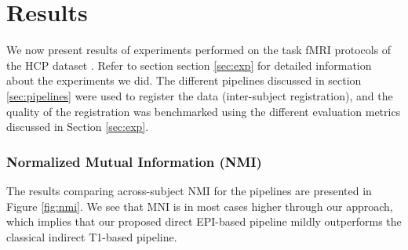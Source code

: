 \section{Results}
\label{sec:results}
We now present results of experiments performed on the task fMRI
protocols of the HCP dataset \citep{VanEssen20122222}. Refer to
section section \ref{sec:exp} for detailed information about the
experiments we did. The different pipelines discussed in section
\ref{sec:pipelines} were used to register the data (inter-subject
registration), and the quality of the registration was benchmarked
using the different evaluation metrics discussed in Section \ref{sec:exp}. 

\subsubsection{Normalized Mutual Information (NMI)}
The results comparing across-subject NMI for the pipelines are presented in Figure \ref{fig:nmi}. We see that MNI is in most cases higher through our approach, which implies that 
our proposed direct EPI-based pipeline mildly outperforms the classical indirect T1-based pipeline.

